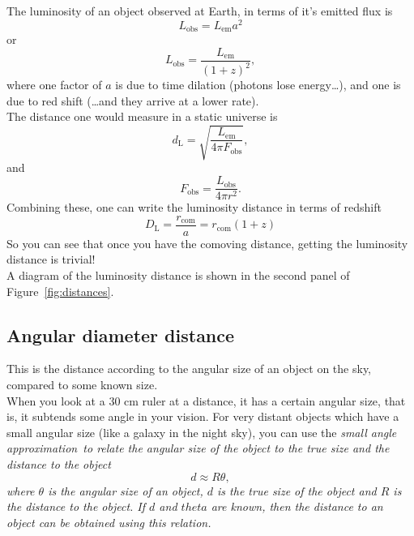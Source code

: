 \documentclass[]{article}
\begin{document}
\noindent The luminosity of an object observed at Earth, in terms of it’s emitted flux is 
\begin{equation}
L_\mathrm{obs} = L_\mathrm{em}a^2
\end{equation}
or
\begin{equation}
L_\mathrm{obs} = \frac{L_\mathrm{em}}{(1+z)^2},
\end{equation}
where one factor of $a$ is due to time dilation (photons lose energy…), and one is due to red shift (…and they arrive at a lower rate).\\

\noindent The distance one would measure in a static universe is
\begin{equation}
d_\mathrm{L} = \sqrt{\frac{L_\mathrm{em}}{4\pi F_\mathrm{obs}}},
\end{equation}
and 
\begin{equation}
F_\mathrm{obs} = \frac{L_\mathrm{obs}}{4\pi r^2}.
\end{equation}
Combining these, one can write the luminosity distance in terms of redshift
\begin{equation}
\boxed{D_\mathrm{L} = \frac{r_\mathrm{com}}{a} = r_\mathrm{com} (1+z)}
\end{equation}
So you can see that once you have the comoving distance, getting the luminosity distance is trivial! \\

\noindent A diagram of the luminosity distance is shown in the second panel of Figure~\ref{fig:distances}.

\subsection{Angular diameter distance}
This is the distance according to the angular size of an object on the sky, compared to some known size.\\ 

\noindent When you look at a 30 cm ruler at a distance, it has a certain angular size, that is, it subtends some angle in your vision. For very distant objects which have a small angular size (like a galaxy in the night sky), you can use the \itshape small angle approximation~\upshape to relate the angular size of the object to the true size and the distance to the object
\begin{equation}
d \approx R \theta,
\end{equation}
where $\theta$ is the angular size of an object, $d$ is the true size of the object and $R$ is the distance to the object. If $d$ and $theta$ are known, then the distance to an object can be obtained using this relation. \\
\end{document}
